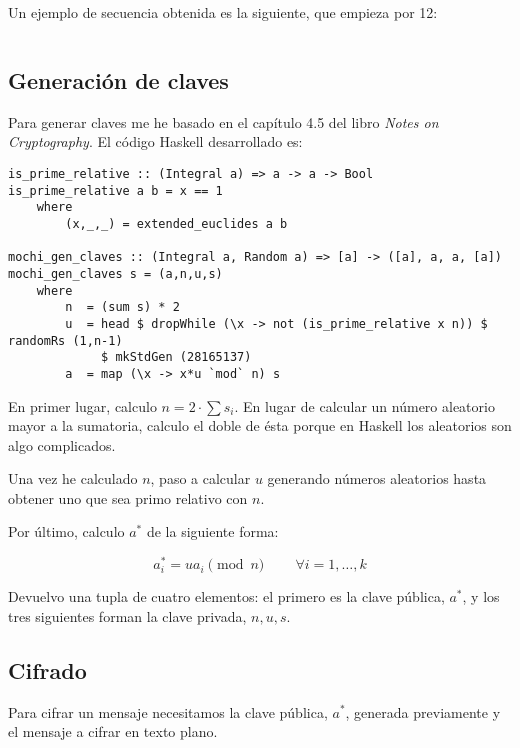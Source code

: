\documentclass[10pt,spanish]{article}
\begin{document}
Un ejemplo de secuencia obtenida es la siguiente, que empieza por 12:

\begin{displaymath}
    [12,24,48,96,192,384,768,1536,3072,6144]
\end{displaymath}

\subsection{\textcolor{azul}Generación de claves}
Para generar claves me he basado en el capítulo 4.5 del libro \textit{\textcolor{azul}{Notes on Cryptography}}. El código Haskell desarrollado es:

\begin{verbatim}
is_prime_relative :: (Integral a) => a -> a -> Bool
is_prime_relative a b = x == 1
    where
        (x,_,_) = extended_euclides a b

mochi_gen_claves :: (Integral a, Random a) => [a] -> ([a], a, a, [a])
mochi_gen_claves s = (a,n,u,s)
    where
        n  = (sum s) * 2
        u  = head $ dropWhile (\x -> not (is_prime_relative x n)) $ randomRs (1,n-1) 
             $ mkStdGen (28165137)
        a  = map (\x -> x*u `mod` n) s
\end{verbatim}

En primer lugar, calculo $n = 2 \cdot \sum s_i$. En lugar de calcular un número aleatorio mayor a la sumatoria, calculo el doble de ésta porque en Haskell los aleatorios son algo complicados. 

Una vez he calculado $n$, paso a calcular $u$ generando números aleatorios hasta obtener uno que sea primo relativo con $n$.

Por último, calculo $a^*$ de la siguiente forma:

\begin{displaymath}
    a_i^* = ua_i \pmod n \qquad\ \forall i=1,\ldots,k 
\end{displaymath}

Devuelvo una tupla de cuatro elementos: el primero es la clave pública, $a^*$, y los tres siguientes forman la clave privada, $n, u, s$.

\subsection{\textcolor{azul}Cifrado}
Para cifrar un mensaje necesitamos la clave pública, $a^*$, generada previamente y el mensaje a cifrar en texto plano. 
\end{document}
